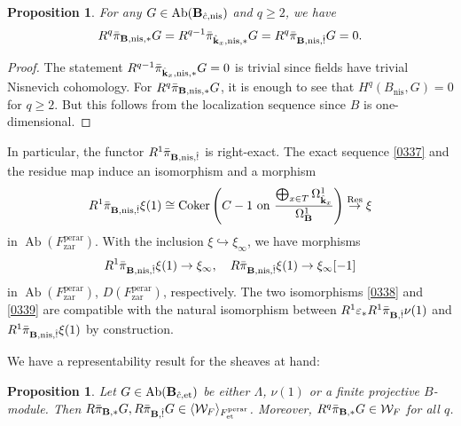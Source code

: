 \documentclass{amsart}
\newtheorem{Prop}[Thm]{Proposition}
\theoremstyle{remark}
\numberwithin{equation}{subsection}
\newcommand{\into}{\hookrightarrow}
\newcommand{\et}{\mathrm{et}}
\newcommand{\zar}{\mathrm{zar}}
\newcommand{\perar}{\mathrm{perar}}
\newcommand{\alg}[1]{\mathbf{#1}}
\newcommand{\nis}{\mathrm{nis}}
\newcommand{\genby}[1]{\langle #1 \rangle}
\DeclareMathOperator{\Coker}{Coker}
\DeclareMathOperator{\Ab}{Ab}
\DeclareMathOperator{\Res}{Res}
\begin{document}
\begin{Prop}
	For any $G \in \Ab(\alg{B}_{\Hat{c}, \nis})$ and $q \ge 2$, we have
		\[
				R^{q} \Bar{\pi}_{\alg{B}, \nis, \ast} G
			=
				R^{q - 1} \Bar{\pi}_{\Hat{\alg{k}}_{x}, \nis, \ast} G
			=
				R^{q} \Bar{\pi}_{\alg{B}, \nis, \Hat{!}} G
			=
				0.
		\]
\end{Prop}

\begin{proof}
	The statement $R^{q - 1} \Bar{\pi}_{\Hat{\alg{k}}_{x}, \nis, \ast} G = 0$ is trivial
	since fields have trivial Nisnevich cohomology.
	For $R^{q} \Bar{\pi}_{\alg{B}, \nis, \ast} G$,
	it is enough to see that $H^{q}(B_{\nis}, G) = 0$ for $q \ge 2$.
	But this follows from the localization sequence
	since $B$ is one-dimensional.
\end{proof}

In particular, the functor $R^{1} \Bar{\pi}_{\alg{B}, \nis, \Hat{!}}$ is right-exact.
The exact sequence \eqref{0337} and the residue map induce an isomorphism and a morphism
	\begin{equation} \label{0339}
			R^{1} \Bar{\pi}_{\alg{B}, \nis, \Hat{!}} \xi(1)
		\cong
			\Coker \left(
					C - 1
				\text{ on }
					\frac{
						\bigoplus_{x \in T}
							\Omega_{\Hat{\alg{k}}_{x}}^{1}
					}{
						\Omega_{\alg{B}}^{1}
					}
			\right)
		\stackrel{\Res}{\to}
			\xi
	\end{equation}
in $\Ab(F^{\perar}_{\zar})$.
With the inclusion $\xi \into \xi_{\infty}$, we have morphisms
	\begin{equation} \label{0354}
			R^{1} \Bar{\pi}_{\alg{B}, \nis, \Hat{!}} \xi(1)
		\to
			\xi_{\infty},
		\quad
			R \Bar{\pi}_{\alg{B}, \nis, \Hat{!}} \xi(1)
		\to
			\xi_{\infty}[-1]
	\end{equation}
in $\Ab(F^{\perar}_{\zar})$, $D(F^{\perar}_{\zar})$, respectively.
The two isomorphisms \eqref{0338} and \eqref{0339} are compatible with
the natural isomorphism between
$R^{1} \varepsilon_{\ast} R^{1} \Bar{\pi}_{\alg{B}, \Hat{!}} \nu(1)$
and $R^{1} \Bar{\pi}_{\alg{B}, \nis, \Hat{!}} \xi(1)$ by construction.

We have a representability result for the sheaves at hand:

\begin{Prop} \label{0082}
	Let $G \in \Ab(\alg{B}_{\Hat{c}, \et})$ be either
	$\Lambda$, $\nu(1)$ or a finite projective $B$-module.
	Then
		$
				R \Bar{\pi}_{\alg{B}, \ast} G,
				R \Bar{\pi}_{\alg{B}, \Hat{!}} G
			\in
				\genby{\mathcal{W}_{F}}_{F^{\perar}_{\et}}
		$.
	Moreover, $R^{q} \Bar{\pi}_{\alg{B}, \ast} G \in \mathcal{W}_{F}$ for all $q$.
\end{Prop}
\end{document}
